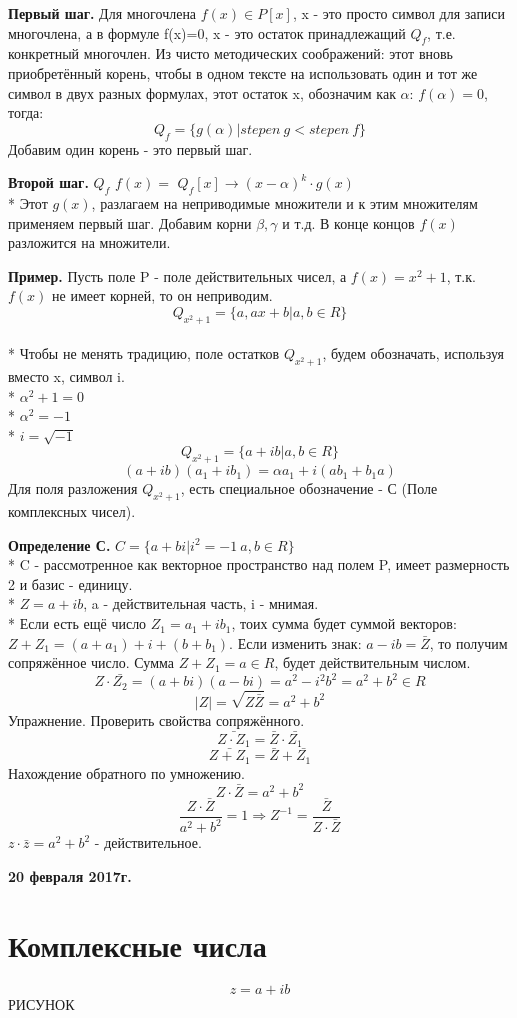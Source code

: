 \documentclass{article}
\begin{document}
{\bf Первый шаг.} Для многочлена $f(x) \in P[x]$, x - это  просто символ для записи многочлена, а в формуле f(x)=0, x - это остаток принадлежащий $Q_f$, т.е. конкретный многочлен. Из чисто методических соображений: этот вновь приобретённый корень, чтобы в одном тексте на использовать один и тот же символ в двух разных формулах, этот остаток x, обозначим как $\alpha$: $f(\alpha)=0$, тогда: $$Q_f=\{g(\alpha)|stepen \:g<stepen \:f\}$$
Добавим  один корень - это первый шаг.

{\bf Второй шаг.} $Q_f$ $f(x)=$ $Q_f[x]\to (x-\alpha)^k\cdot g(x)$\\*
Этот $g(x)$, разлагаем на неприводимые множители и к этим множителям применяем первый шаг. Добавим корни $\beta, \gamma$ и т.д. В конце концов $f(x)$ разложится на множители.

{\bf Пример.} Пусть поле P - поле действительных чисел, а $f(x)=x^2+1$, т.к. $f(x)$ не имеет корней, то он неприводим. $$Q_{x^2+1}=\{a, ax+b| a,b\in R\}$$\\*
Чтобы не менять традицию, поле остатков $Q_{x^2+1}$, будем обозначать, используя вместо x, символ i.\\*
$\alpha^2+1=0$\\*
$\alpha^2=-1$\\*
$i=\sqrt{-1}$
$$Q_{x^2+1}=\{a+ib| a,b\in R\}$$
$$(a+ib)(a_1+ib_1)=\alpha a_1+i(ab_1+b_1a)$$
Для поля разложения $Q_{x^2+1}$, есть специальное обозначение - С (Поле комплексных чисел).

{\bf Определение С.} $C=\{a+bi|i^2=-1\: a,b\in R\}$\\*
C - рассмотренное как векторное пространство над полем P, имеет размерность 2 и базис - единицу.\\*
$Z=a+ib$, a - действительная часть, i - мнимая.\\*
Если есть ещё число $Z_1=a_1+ib_1$, тоих сумма будет суммой векторов: $Z+Z_1=(a+a_1)+i+(b+b_1)$. Если изменить знак: $a-ib=\bar{Z}$, то получим сопряжённое число. Сумма $Z+Z_1=a \in R$, будет действительным числом. $$Z \cdot \bar{Z_2}=(a+bi)(a-bi)=a^2-i^2b^2=a^2+b^2 \in R$$ $$|Z|= \sqrt{Z\bar{Z}}=a^2+b^2$$
Упражнение. Проверить свойства сопряжённого. $$\bar{Z\cdot Z_1}=\bar{Z}\cdot \bar{Z_1}$$
$$\bar{Z+Z_1}=\bar{Z}+\bar{Z_1}$$
Нахождение обратного по умножению. $$Z\cdot \bar{Z}=a^2+b^2$$ $$\frac{Z\cdot \bar{Z}}{a^2+b^2}=1\Rightarrow Z^{-1}=\frac{\bar{Z}}{Z\cdot \bar{Z}}$$
$z\cdot \bar{z}=a^2+b^2$ - действительное.

\textbf {20 февраля 2017г.}
\section*{Комплексные числа}
$$z=a+ib$$ РИСУНОК
\end{document}
